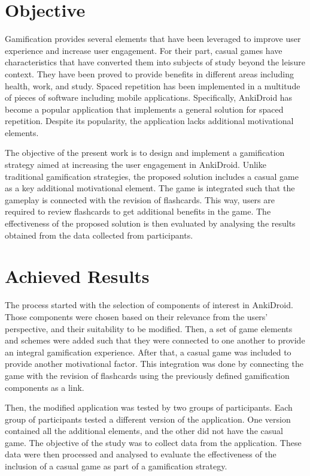 \section{Objective}
Gamification provides several elements that have been leveraged to improve user experience and increase user engagement. For their part, casual games have characteristics that have converted them into subjects of study beyond the leisure context. They have been proved to provide benefits in different areas including health, work, and study. Spaced repetition has been implemented in a multitude of pieces of software including mobile applications. Specifically, AnkiDroid \citep{raoul2012ankidroid} has become a popular application that implements a general solution for spaced repetition. Despite its popularity, the application lacks additional motivational elements.

The objective of the present work is to design and implement a gamification strategy aimed at increasing the user engagement in AnkiDroid. Unlike traditional gamification strategies, the proposed solution includes a casual game as a key additional motivational element. The game is integrated such that the gameplay is connected with the revision of flashcards. This way, users are required to review flashcards to get additional benefits in the game. The effectiveness of the proposed solution is then evaluated by analysing the results obtained from the data collected from participants.


\section{Achieved Results}
The process started with the selection of components of interest in AnkiDroid. Those components were chosen based on their relevance from the users' perspective, and their suitability to be modified. Then, a set of game elements and schemes were added such that they were connected to one another to provide an integral gamification experience. After that, a casual game was included to provide another motivational factor. This integration was done by connecting the game with the revision of flashcards using the previously defined gamification components as a link.

Then, the modified application was tested by two groups of participants. Each group of participants tested a different version of the application. One version contained all the additional elements, and the other did not have the casual game. The objective of the study was to collect data from the application. These data were then processed and analysed to evaluate the effectiveness of the inclusion of a casual game as part of a gamification strategy.

